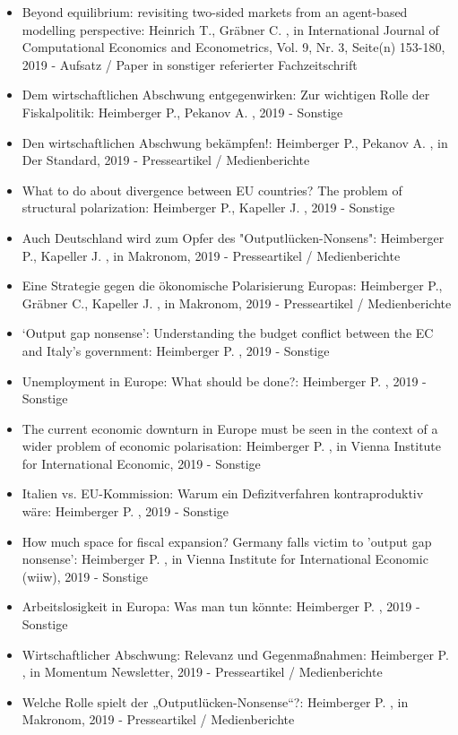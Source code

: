 \begin{itemize}
	 \item Beyond equilibrium: revisiting two-sided markets from an agent-based modelling perspective: Heinrich T., Gräbner C. , in International Journal of Computational Economics and Econometrics, Vol. 9, Nr. 3, Seite(n) 153-180, 2019 - Aufsatz / Paper in sonstiger referierter Fachzeitschrift
	 \item Dem wirtschaftlichen Abschwung entgegenwirken: Zur wichtigen Rolle der Fiskalpolitik: Heimberger P., Pekanov A. , 2019 - Sonstige
	 \item Den wirtschaftlichen Abschwung bekämpfen!: Heimberger P., Pekanov A. , in Der Standard, 2019 - Presseartikel / Medienberichte
	 \item What to do about divergence between EU countries? The problem of structural polarization: Heimberger P., Kapeller J. , 2019 - Sonstige
	 \item Auch Deutschland wird zum Opfer des "Outputlücken-Nonsens": Heimberger P., Kapeller J. , in Makronom, 2019 - Presseartikel / Medienberichte
	 \item Eine Strategie gegen die ökonomische Polarisierung Europas: Heimberger P., Gräbner C., Kapeller J. , in Makronom, 2019 - Presseartikel / Medienberichte
	 \item ‘Output gap nonsense': Understanding the budget conflict between the EC and Italy’s government: Heimberger P. , 2019 - Sonstige
	 \item Unemployment in Europe: What should be done?: Heimberger P. , 2019 - Sonstige
	 \item The current economic downturn in Europe must be seen in the context of a wider problem of economic polarisation: Heimberger P. , in Vienna Institute for International Economic, 2019 - Sonstige
	 \item Italien vs. EU-Kommission: Warum ein Defizitverfahren kontraproduktiv wäre: Heimberger P. , 2019 - Sonstige
	 \item How much space for fiscal expansion? Germany falls victim to 'output gap nonsense’: Heimberger P. , in Vienna Institute for International Economic (wiiw), 2019 - Sonstige
	 \item Arbeitslosigkeit in Europa: Was man tun könnte: Heimberger P. , 2019 - Sonstige
	 \item Wirtschaftlicher Abschwung: Relevanz und Gegenmaßnahmen: Heimberger P. , in Momentum Newsletter, 2019 - Presseartikel / Medienberichte
	 \item Welche Rolle spielt der „Outputlücken-Nonsense“?: Heimberger P. , in Makronom, 2019 - Presseartikel / Medienberichte

\end{itemize}
